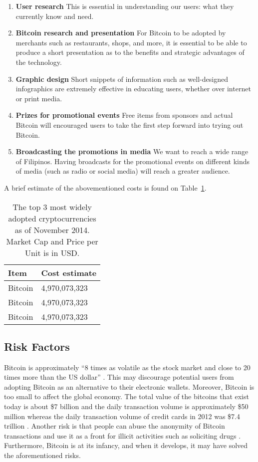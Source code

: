\documentclass{acm_proc_article-sp}
\begin{document}
\begin{enumerate}
	\item \textbf{User research} This is essential in understanding our users: what they currently know and need.
	\item \textbf{Bitcoin research and presentation} For Bitcoin to be adopted by merchants such as restaurants, shops, and more, it is essential to be able to produce a short presentation as to the benefits and strategic advantages of the technology.
	\item \textbf{Graphic design} Short snippets of information such as well-designed infographics are extremely effective in educating users, whether over internet or print media.
	\item \textbf{Prizes for promotional events} Free items from sponsors and actual Bitcoin will encouraged users to take the first step forward into trying out Bitcoin.
	\item \textbf{Broadcasting the promotions in media} We want to reach a wide range of Filipinos. Having broadcasts for the promotional events on different kinds of media (such as radio or social media) will reach a greater audience.
\end{enumerate}

A brief estimate of the abovementioned costs is found on Table~\ref{cost_table}.

\begin{table}[h]
\centering
\begin{tabular}{ | l | l | }
\hline
  Item & Cost estimate  \\ \hline 
  Bitcoin   & 4,970,073,323 \\ \hline
  Bitcoin   & 4,970,073,323 \\ \hline
  Bitcoin   & 4,970,073,323 \\ \hline
\end{tabular}
  \caption{The top 3 most widely adopted cryptocurrencies as of November 2014. Market Cap and Price per Unit is in USD.}
  \label{cost_table}
\end{table}

\subsection{Risk Factors}
Bitcoin is approximately ``8 times as volatile as the stock market and close to 20 times more than the US dollar'' \cite{BitcoinMyths:08182014}. This may discourage potential users from adopting Bitcoin as an alternative to their electronic wallets. Moreover, Bitcoin is too small to affect the global economy. The total value of the bitcoins that exist today is about \$7 billion and the daily transaction volume is approximately \$50 million whereas the daily transaction volume of credit cards in 2012 was \$7.4 trillion \cite{BitcoinMyths:08182014}. Another risk is that people can abuse the anonymity of Bitcoin transactions and use it as a front for illicit activities such as soliciting drugs \cite{Worldbank:2014}. Furthermore, Bitcoin is at its infancy, and when it develops, it may have solved the aforementioned risks.
\end{document}
